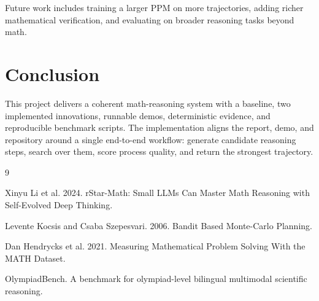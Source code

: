 \documentclass[sigconf,nonacm]{acmart}
\begin{document}
Future work includes training a larger PPM on more trajectories, adding richer
mathematical verification, and evaluating on broader reasoning tasks beyond
math.

\section{Conclusion}

This project delivers a coherent math-reasoning system with a baseline, two
implemented innovations, runnable demos, deterministic evidence, and
reproducible benchmark scripts. The implementation aligns the report, demo, and
repository around a single end-to-end workflow: generate candidate reasoning
steps, search over them, score process quality, and return the strongest
trajectory.

\begin{thebibliography}{9}

Xinyu Li et al. 2024. rStar-Math: Small LLMs Can Master Math Reasoning with
Self-Evolved Deep Thinking.

Levente Kocsis and Csaba Szepesvari. 2006. Bandit Based Monte-Carlo Planning.

Dan Hendrycks et al. 2021. Measuring Mathematical Problem Solving With the MATH
Dataset.

OlympiadBench. A benchmark for olympiad-level bilingual multimodal scientific
reasoning.

\end{thebibliography}
\end{document}
